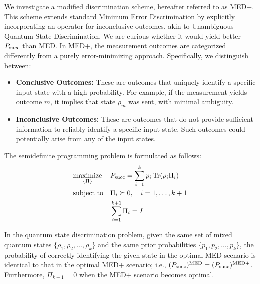 We investigate a modified discrimination scheme, hereafter referred to as MED+.
This scheme extends standard Minimum Error Discrimination by explicitly
incorporating an operator for inconclusive outcomes, akin to Unambiguous
Quantum State Discrimination.
We are curious whether it would yield better $P_{\mathrm{succ}}$ than MED.
In MED+, the measurement outcomes are categorized differently from a purely
error-minimizing approach. Specifically, we distinguish between:
\begin{itemize}
    \item \textbf{Conclusive Outcomes:} These are outcomes that uniquely identify a specific input state with a high probability.
          For example, if the measurement yields outcome $m$, it implies that state $\rho_m$ was sent, with minimal ambiguity.
    \item \textbf{Inconclusive Outcomes:} These are outcomes that do not provide sufficient information to reliably identify a specific input state.
          Such outcomes could potentially arise from any of the input states.
\end{itemize}

The semidefinite programming problem is formulated as follows:
\begin{align}
     & \underset{\{\Pi\}}{\text{maximize}} &  & P_{\mathrm{succ}}=\sum_{i=1}^{k} p_{i} \operatorname{Tr}(\rho_{i} \Pi_{i}) \\
     & \text{subject to}                   &  & \Pi_{i} \succeq 0, \quad i = 1, \ldots, k+1                     \\
     &                                     &  & \sum_{i=1}^{k+1} \Pi_i = I
\end{align}


\begin{theorem} \label{thm:med_medplus}
    In the quantum state discrimination problem, given the same set of
    mixed quantum states $\{ \rho_{1}, \rho_{2}, \dots, \rho_{k} \}$
    and the same prior probabilities $\{p_{1}, p_{2}, \dots, p_{k}\}$, the\\
    probability of correctly identifying the given state in the optimal MED
    scenario is identical to that in the optimal MED+ scenario; i.e.,
    $(P_{\mathrm{succ}})^{\textnormal{MED}} = (P_{\mathrm{succ}})^{\textnormal{MED+}}$.
    Furthermore, $\Pi_{k+1} = 0$ when the MED+ scenario becomes optimal.
\end{theorem}


